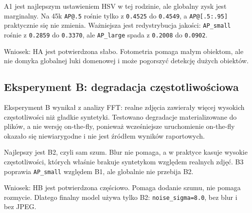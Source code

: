 \documentclass[
  11pt,
]{article}
\begin{document}
A1 jest najlepszym ustawieniem HSV w tej rodzinie, ale globalny zysk
jest marginalny. Na 45k \texttt{AP@.5} rośnie tylko z \texttt{0.4525} do
\texttt{0.4549}, a \texttt{AP@{[}.5:.95{]}} praktycznie się nie zmienia.
Ważniejsza jest redystrybucja jakości: \texttt{AP\_small} rośnie z
\texttt{0.2859} do \texttt{0.3370}, ale \texttt{AP\_large} spada z
\texttt{0.2008} do \texttt{0.0902}.

Wniosek: HA jest potwierdzona słabo. Fotometria pomaga małym obiektom,
ale nie domyka globalnej luki domenowej i może pogorszyć detekcję dużych
obiektów.

\hypertarget{eksperyment-b-degradacja-czux119stotliwoux15bciowa}{%
\subsection{Eksperyment B: degradacja
częstotliwościowa}\label{eksperyment-b-degradacja-czux119stotliwoux15bciowa}}

Eksperyment B wynikał z analizy FFT: realne zdjęcia zawierały więcej
wysokich częstotliwości niż gładkie syntetyki. Testowano degradacje
materializowane do plików, a nie wersję on-the-fly, ponieważ
wcześniejsze uruchomienie on-the-fly okazało się niewiarygodne i nie
jest źródłem wyników raportowych.

\begingroup
{}
\noindent{}
\endgroup


Najlepszy jest B2, czyli sam szum. Blur nie pomaga, a w praktyce kasuje
wysokie częstotliwości, których właśnie brakuje syntetykom względem
realnych zdjęć. B3 poprawia \texttt{AP\_small} względem B1, ale
globalnie nie przebija B2.

Wniosek: HB jest potwierdzona częściowo. Pomaga dodanie szumu, nie
pomaga rozmycie. Dlatego finalny model używa tylko B2:
\texttt{noise\_sigma=8.0}, bez blur i bez JPEG.
\end{document}

